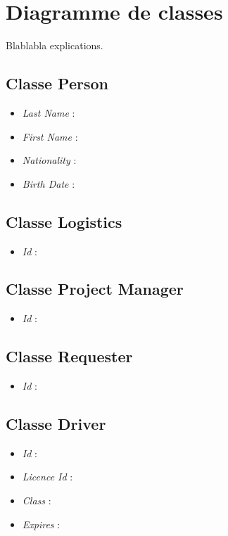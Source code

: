 \section{Diagramme de classes}

Blablabla explications.
\subsection{Classe Person}
\begin{itemize}
	\item \textit{Last Name} :
	\item \textit{First Name} :
	\item \textit{Nationality} :
	\item \textit{Birth Date} :
\end{itemize}

\subsection{Classe Logistics}
\begin{itemize}
	\item \textit{Id} :
\end{itemize}

\subsection{Classe Project Manager}
\begin{itemize}
	\item \textit{Id} :
\end{itemize}

\subsection{Classe Requester}
\begin{itemize}
	\item \textit{Id} :
\end{itemize}

\subsection{Classe Driver}
\begin{itemize}
	\item \textit{Id} :
	\item \textit{Licence Id} :
	\item \textit{Class} :
	\item \textit{Expires} :
\end{itemize}

